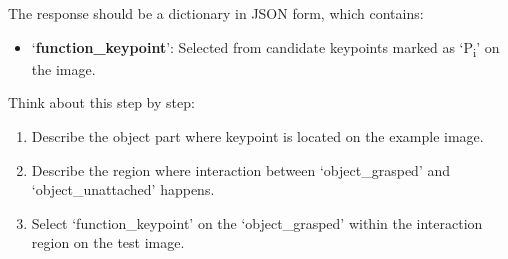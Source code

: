 \begin{center}
\begin{tcolorbox}[colback=gray!5, colframe=black!40, sharp corners=south, title= Function Point Transfer Prompt]
The response should be a dictionary in JSON form, which contains:
\begin{itemize}
    \item `\textbf{function\_keypoint}': Selected from candidate keypoints marked as `P\textsubscript{i}' on the image. \\
\end{itemize}

Think about this step by step:
\begin{enumerate}[leftmargin=*, label=\arabic*.]
    \item Describe the object part where keypoint is located on the example image.
    \item Describe the region where interaction between `object\_grasped' and `object\_unattached' happens.
    \item Select `function\_keypoint' on the `object\_grasped' within the interaction region on the test image.
\end{enumerate}
\end{tcolorbox}
\end{center}

\newpage


